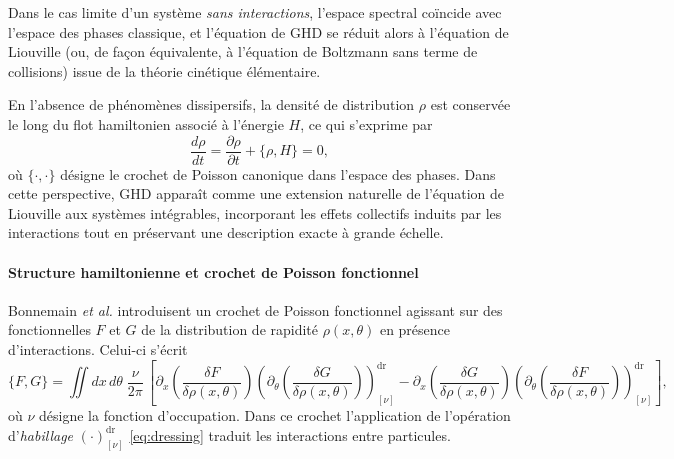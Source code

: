 \medskip

Dans le cas limite d’un système \emph{sans interactions}, l’espace spectral coïncide avec l’espace des phases classique, et l’équation de \gls{GHD} se réduit alors à l’équation de Liouville (ou, de façon équivalente, à l’équation de Boltzmann sans terme de collisions) issue de la théorie cinétique élémentaire.

\medskip

En l’absence de phénomènes dissipersifs, la densité de distribution $\rho$ est conservée le long du flot hamiltonien associé à l’énergie $H$, ce qui s’exprime par
\begin{equation}\label{chap:GHD:eq.Liouv.1}
	\frac{d \rho}{dt} 
	= \frac{\partial \rho}{\partial t } + \{ \rho , H \} = 0,
\end{equation}
où $\{\cdot , \cdot\}$ désigne le crochet de Poisson canonique dans l’espace des phases.  
Dans cette perspective, \gls{GHD} apparaît comme une extension naturelle de l’équation de Liouville aux systèmes intégrables, incorporant les effets collectifs induits par les interactions tout en préservant une description exacte à grande échelle.


\paragraph{Structure hamiltonienne et crochet de Poisson fonctionnel}  
Bonnemain \emph{et al.} \cite{bonnemain2024hamiltonian} introduisent un crochet de Poisson fonctionnel agissant sur des fonctionnelles $F$ et $G$ de la distribution de rapidité $\rho(x,\theta)$ en présence d’interactions. Celui-ci s’écrit
\begin{equation}\label{chap:GHD:eq.chochet.bonnemain.1}
	\{F,G\}
	=\iint dx\,d\theta\;\frac{\nu}{2\pi}\,
	\left[
		\partial_x \left( \frac{\delta F}{\delta \rho(x,\theta)} \right)
		\left( \partial_\theta \left( \frac{\delta G}{\delta \rho(x,\theta)} \right) \right)^{\mathrm{dr}}_{[\nu]}
		-
		\partial_x \left( \frac{\delta G}{\delta \rho(x,\theta)} \right)
		\left( \partial_\theta \left( \frac{\delta F}{\delta \rho(x,\theta)} \right) \right)^{\mathrm{dr}}_{[\nu]}
	\right],
\end{equation}
où $\nu$ désigne la fonction d’occupation. Dans ce crochet l'application de l’opération d’\emph{habillage} $(\cdot)^{\mathrm{dr}}_{[\nu]}$ \eqref{eq:dressing}  traduit les interactions entre particules.


